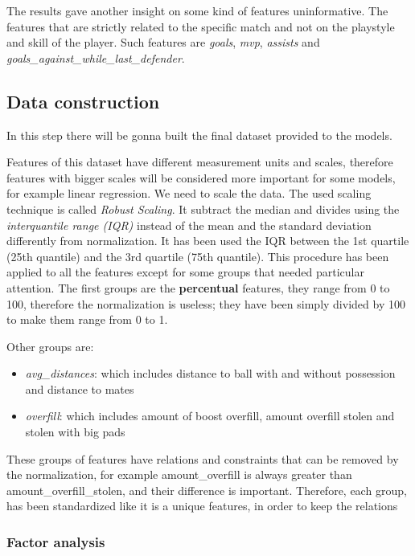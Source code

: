 The results gave another insight on some kind of features uninformative. The features that are strictly related to the specific match and not on the playstyle and skill of the player. Such features are \textit{goals}, \textit{mvp}, \textit{assists} and \textit{goals\_against\_while\_last\_defender}.

\subsection{Data construction}

In this step there will be gonna built the final dataset provided to the models.

Features of this dataset have different measurement units and scales, therefore features with bigger scales will be considered more important for some models, for example linear regression. We need to scale the data.
The used scaling technique is called \textit{Robust Scaling}. It subtract the median and divides using the \textit{interquantile range (IQR)} instead of the mean and the standard deviation differently from normalization. It has been used the IQR between the 1st quartile (25th quantile) and the 3rd quartile (75th quantile).
This procedure has been applied to all the features except for some groups that needed particular attention.
The first groups are the \textbf{percentual} features, they range from 0 to 100, therefore the normalization is useless; they have been simply divided by 100 to make them range from 0 to 1. 

Other groups are:
\begin{itemize}
    \item \textit{avg\_distances}: which includes distance to ball with and without possession and distance to mates
    \item \textit{overfill}: which includes amount of boost overfill, amount overfill stolen and stolen with big pads
\end{itemize}

These groups of features have relations and constraints that can be removed by the normalization, for example amount\_overfill is always greater than amount\_overfill\_stolen, and their difference is important. Therefore, each group, has been standardized like it is a unique features, in order to keep the relations


\subsubsection{Factor analysis}

